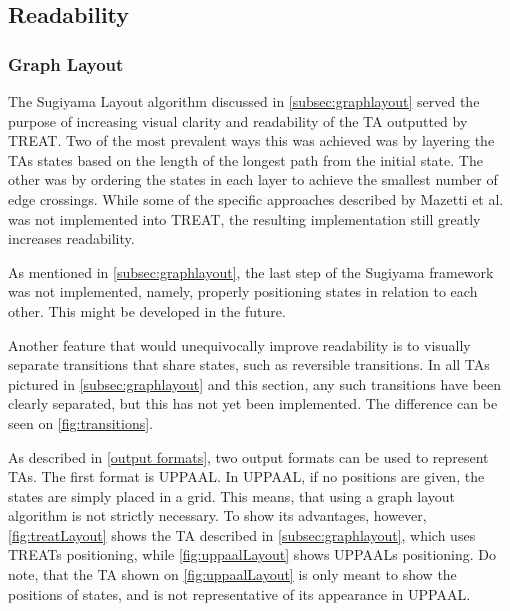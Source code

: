 \subsection{Readability}

\subsubsection{Graph Layout}
The Sugiyama Layout algorithm discussed in \cref{subsec:graphlayout} served the purpose of increasing visual clarity and readability of the TA outputted by TREAT.
Two of the most prevalent ways this was achieved was by layering the TAs states based on the length of the longest path from the initial state. The other was by ordering the states in each layer to achieve the smallest number of edge crossings.
While some of the specific approaches described by Mazetti et al. \cite{Mazetti2012} was not implemented into TREAT, the resulting implementation still greatly increases readability.

As mentioned in \cref{subsec:graphlayout}, the last step of the Sugiyama framework was not implemented, namely, properly positioning states in relation to each other. This might be developed in the future.

Another feature that would unequivocally improve readability is to visually separate transitions that share states, such as reversible transitions.
In all TAs pictured in \cref{subsec:graphlayout} and this section, any such transitions have been clearly separated, but this has not yet been implemented. The difference can be seen on \cref{fig:transitions}.

\begin{center}
    
\end{center}

As described in \cref{output formats}, two output formats can be used to represent TAs.
The first format is UPPAAL. In UPPAAL, if no positions are given, the states are simply placed in a grid. This means, that using a graph layout algorithm is not strictly necessary.
To show its advantages, however, \cref{fig:treatLayout} shows the TA described in \cref{subsec:graphlayout}, which uses TREATs positioning, while \cref{fig:uppaalLayout} shows UPPAALs positioning.
Do note, that the TA shown on \cref{fig:uppaalLayout} is only meant to show the positions of states, and is not representative of its appearance in UPPAAL.

